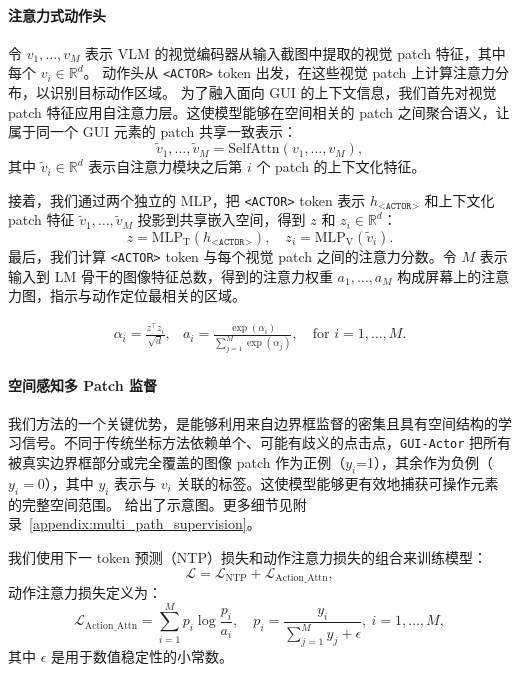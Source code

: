 \documentclass{article}
\newcommand{\sys}{\texttt{GUI-Actor}\xspace}
\begin{document}
\paragraph{注意力式动作头}
令 ${v_1, \dots, v_M}$ 表示 VLM 的视觉编码器从输入截图中提取的视觉 patch 特征，其中每个 $v_i \in \mathbb{R}^d$。
动作头从 \texttt{<ACTOR>} token 出发，在这些视觉 patch 上计算注意力分布，以识别目标动作区域。
为了融入面向 GUI 的上下文信息，我们首先对视觉 patch 特征应用自注意力层。这使模型能够在空间相关的 patch 之间聚合语义，让属于同一个 GUI 元素的 patch 共享一致表示：
\begin{equation}
\tilde{v}_1, \dots, \tilde{v}_M = \text{SelfAttn}(v_1, \dots, v_M),
\end{equation}
其中 $\tilde{v}_i \in \mathbb{R}^d$ 表示自注意力模块之后第 $i$ 个 patch 的上下文化特征。

接着，我们通过两个独立的 MLP，把 \texttt{<ACTOR>} token 表示 $h_{\texttt{<ACTOR>}}$ 和上下文化 patch 特征 ${\tilde{v}_1, \dots, \tilde{v}_M}$ 投影到共享嵌入空间，得到 $z$ 和 $z_i \in \mathbb{R}^d$：
\begin{equation}
z = \text{MLP}_{\text{T}}(h_{\texttt{<ACTOR>}}), \quad z_i = \text{MLP}_{\text{V}}(\tilde{v}_i).
\end{equation}
最后，我们计算 \texttt{<ACTOR>} token 与每个视觉 patch 之间的注意力分数。令 $M$ 表示输入到 LM 骨干的图像特征总数，得到的注意力权重 ${a_1, \dots, a_M}$ 构成屏幕上的注意力图，指示与动作定位最相关的区域。

\begin{equation}
\begin{array}{ll}
\displaystyle \alpha_i = \frac{z^\top z_i}{\sqrt{d}}, &
\displaystyle a_i = \frac{\exp(\alpha_i)}{\sum_{j=1}^M \exp(\alpha_j)}, \quad \text{for } i = 1, \dots, M.
\end{array}
\end{equation}

\paragraph{空间感知多 Patch 监督}
我们方法的一个关键优势，是能够利用来自边界框监督的密集且具有空间结构的学习信号。不同于传统坐标方法依赖单个、可能有歧义的点击点，\sys 把所有被真实边界框部分或完全覆盖的图像 patch 作为正例（$y_i$=1），其余作为负例（$y_i=0$），其中 $y_i$ 表示与 $v_i$ 关联的标签。这使模型能够更有效地捕获可操作元素的完整空间范围。 给出了示意图。更多细节见附录~\ref{appendix:multi_path_supervision}。

我们使用下一 token 预测（NTP）损失和动作注意力损失的组合来训练模型：
\begin{equation}
\mathcal{L} = \mathcal{L}_{\text{NTP}} + \mathcal{L}_{\text{Action\_Attn}},
\end{equation}
动作注意力损失定义为：
\begin{equation}
\mathcal{L}_{\text{Action\_Attn}} = \sum_{i=1}^M p_i \log \frac{p_i}{a_i}, \quad p_i = \frac{y_i}{\sum_{j=1}^M y_j + \epsilon}, ~i = 1, \dots, M,
\end{equation}
其中 $\epsilon$ 是用于数值稳定性的小常数。
\end{document}
